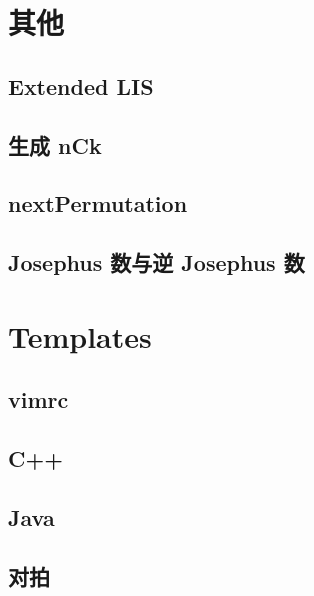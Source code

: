 \documentclass[10pt]{article}
\begin{document}
\section{其他}
	\subsection{Extended LIS}
		

	\subsection{生成 nCk}
		

	\subsection{nextPermutation}
		

	\subsection{Josephus 数与逆 Josephus 数}	
		

\section{Templates}
	\subsection{vimrc}
		
	\subsection{C++}
		
	\subsection{Java}
		
	\subsection{对拍}
		
	
\end{document}
